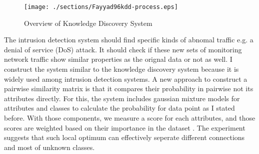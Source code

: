 \begin{figure}[htb2]
\begin{center}
\texttt{[image: ./sections/Fayyad96kdd-process.eps]}
\end{center}
\caption{Overview of Knowledge Discovery System}
\label{fig:refSingleRobot1}
\end{figure}
The intrusion detection system should find specific kinds of abnomal traffic e.g. a denial of service (DoS) attack. 
It should check if these new sets of monitoring network traffic show similar properties as the orignal data or not as well. 
I construct the system similar to the knowledge discovery system \cite{fayyad96} because it is widely used among intrusion detection systems. 
A new approach to construct a pairwise similarity matrix is that it compares their probability in pairwise not its attributes directly. 
For this, the system includes gaussian mixture models for attributes and classes to calculate the probability for data point as I stated before. 
With those components, we measure a score for each attributes, and those scores are weighted based on their importance in the dataset \cite{kayacik05}.
The experiment suggests that such local optimum can effectively seperate different connections and most of unknown classes. 

